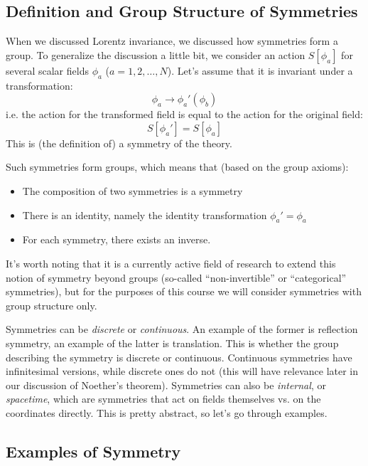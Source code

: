 \subsection{Definition and Group Structure of Symmetries}
When we discussed Lorentz invariance, we discussed how symmetries form a group. To generalize the discussion a little bit, we consider an action $S[\phi_a]$ for several scalar fields $\phi_a$ ($a = 1, 2, \ldots, N$). Let's assume that it is invariant under a transformation:
\begin{equation}
    \phi_a \to \phi_a'(\phi_b)
\end{equation}
i.e. the action for the transformed field is equal to the action for the original field:
\begin{equation}
    S[\phi_a'] = S[\phi_a]
\end{equation}
This is (the definition of) a symmetry of the theory.

Such symmetries form groups, which means that (based on the group axioms):
\begin{itemize}
    \item The composition of two symmetries is a symmetry
    \item There is an identity, namely the identity transformation $\phi_a' = \phi_a$
    \item For each symmetry, there exists an inverse.
\end{itemize}
It's worth noting that it is a currently active field of research to extend this notion of symmetry beyond groups (so-called ``non-invertible'' or ``categorical'' symmetries), but for the purposes of this course we will consider symmetries with group structure only.

Symmetries can be \emph{discrete} or \emph{continuous}. An example of the former is reflection symmetry, an example of the latter is translation. This is whether the group describing the symmetry is discrete or continuous. Continuous symmetries have infinitesimal versions, while discrete ones do not (this will have relevance later in our discussion of Noether's theorem). Symmetries can also be \emph{internal}, or \emph{spacetime}, which are symmetries that act on fields themselves vs. on the coordinates directly. This is pretty abstract, so let's go through examples.

\subsection{Examples of Symmetry}
